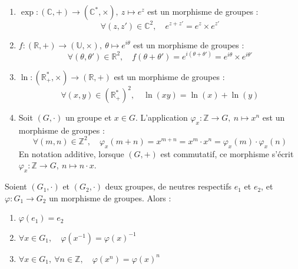 \documentclass[a4paper,11pt]{article}
\newcommand{\R}{\mathbb{R}}
\newcommand{\C}{\mathbb{C}}
\newcommand{\Z}{\mathbb{Z}}
\newcommand{\U}{\mathbb{U}}
\begin{document}
\begin{exemples}
\begin{enumerate}
  \item $\exp : (\C, +) \to (\C^*, \times), \ z \mapsto e^z$ est un morphisme de groupes :
  \[
  \forall (z, z') \in \C^2, \quad e^{z + z'} = e^z \times e^{z'}
  \]
  \item $f : (\R, +) \to (\U, \times), \ \theta \mapsto e^{i\theta}$ est un morphisme de groupes :
  \[
  \forall (\theta, \theta') \in \R^2, \quad f(\theta + \theta') = e^{i(\theta + \theta')} = e^{i\theta} \times e^{i\theta'}
  \]
  \item $\ln : (\R_+^*, \times) \to (\R, +)$ est un morphisme de groupes :
  \[
  \forall (x, y) \in (\R_+^*)^2, \quad \ln(xy) = \ln(x) + \ln(y)
  \]
  \item Soit $(G, \cdot)$ un groupe et $x \in G$. L'application $\varphi_x : \Z \to G, \ n \mapsto x^n$ est un morphisme de groupes :
  \[
  \forall (m, n) \in \Z^2, \quad \varphi_x(m + n) = x^{m+n} = x^m \cdot x^n = \varphi_x(m) \cdot \varphi_x(n)
  \]
  En notation additive, lorsque $(G, +)$ est commutatif, ce morphisme s'écrit $\varphi_x : \Z \to G, \ n \mapsto n \cdot x$.
\end{enumerate}
\end{exemples}

\begin{proposition}
Soient $(G_1, \cdot)$ et $(G_2, \cdot)$ deux groupes, de neutres respectifs $e_1$ et $e_2$, et $\varphi : G_1 \to G_2$ un morphisme de groupes. Alors :
\begin{enumerate}
  \item $\varphi(e_1) = e_2$
  \item $\forall x \in G_1, \quad \varphi(x^{-1}) = \varphi(x)^{-1}$
  \item $\forall x \in G_1, \ \forall n \in \Z, \quad \varphi(x^n) = \varphi(x)^n$
\end{enumerate}
\end{proposition}
\end{document}
